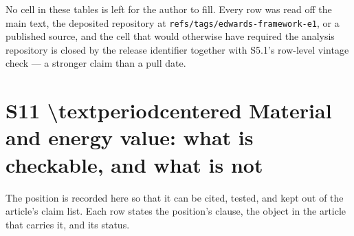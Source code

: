\documentclass[11pt]{article}
\begin{document}
No cell in these tables is left for the author to fill. Every row was read off the main text, the deposited repository at \texttt{refs/tags/edwards-framework-e1}, or a published source, and the cell that would otherwise have required the analysis repository is closed by the release identifier together with S5.1's row-level vintage check --- a stronger claim than a pull date.

\section*{S11 \textbackslash{}textperiodcentered{} Material and energy value: what is checkable, and what is not}\label{s11-textperiodcentered{}-material-and-energy-value-what-is-checkable-a}

The position is recorded here so that it can be cited, tested, and kept out of the article's claim list. Each row states the position's clause, the object in the article that carries it, and its status.
\end{document}
